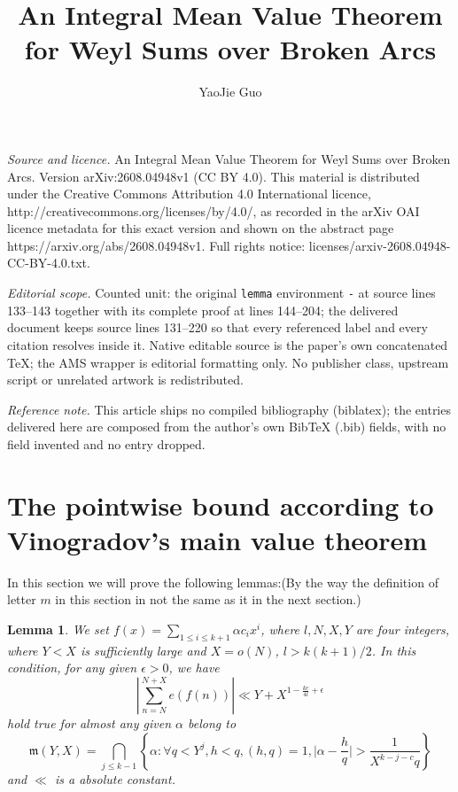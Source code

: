 \documentclass[10pt,a4paper]{amsart}
\newtheorem{lemma}{Lemma}[section]
\begin{document}
\title[An Integral Mean Value Theorem for Weyl Sums over Broken Arc]{An Integral Mean Value Theorem for Weyl Sums over Broken Arcs}
\author{YaoJie Guo}
\date{}
\maketitle
\noindent\emph{Source and licence.} An Integral Mean Value Theorem for Weyl Sums over Broken Arcs. Version arXiv:2608.04948v1 (CC BY 4.0). This material is distributed under the Creative Commons Attribution 4.0 International licence, http://creativecommons.org/licenses/by/4.0/, as recorded in the arXiv OAI licence metadata for this exact version and shown on the abstract page https://arxiv.org/abs/2608.04948v1. Full rights notice: licenses/arxiv-2608.04948-CC-BY-4.0.txt.\par\smallskip
\noindent\textit{Editorial scope.} Counted unit: the original \texttt{lemma} environment \texttt{-} at source lines 133--143 together with its complete proof at lines 144--204; the delivered document keeps source lines 131--220 so that every referenced label and every citation resolves inside it. Native editable source is the paper's own concatenated TeX; the AMS wrapper is editorial formatting only. No publisher class, upstream script or unrelated artwork is redistributed.
\par\smallskip\noindent\textit{Reference note.} This article ships no compiled bibliography (biblatex); the entries delivered here are composed from the author's own BibTeX (.bib) fields, with no field invented and no entry dropped.
\section{The pointwise bound according to Vinogradov's main value theorem}
In this section we will prove the following lemmas:(By the way the definition of letter $m$ in this section in not the same as it in the next section.)

\begin{lemma}
We set $f(x)=\sum_{1\leq i\leq k+1}\alpha c_{i}x^i$, where $l,N,X,Y$ are four integers, where $Y<X$ is sufficiently large and $X=o(N)$, $l>k(k+1)/2$. In this condition, for any given $\epsilon>0$, we have
\begin{equation}
|\sum\limits_{n=N}^{N+X}e(f(n))|\ll Y+X^{1-\frac{kc}{4l}+\epsilon}
\end{equation}
hold true for almost any given $\alpha$ belong to
\[
\mathfrak{m}(Y,X)=\bigcap_{j\leq k-1}\left\{\alpha:\forall q<Y^j,h<q,(h,q)=1,\Big|\alpha-\frac{h}{q}\Big|>\frac{1}{X^{k-j-c}q}\right\}
\]
and $\ll$ is a absolute constant.
\end{lemma}
\end{document}
